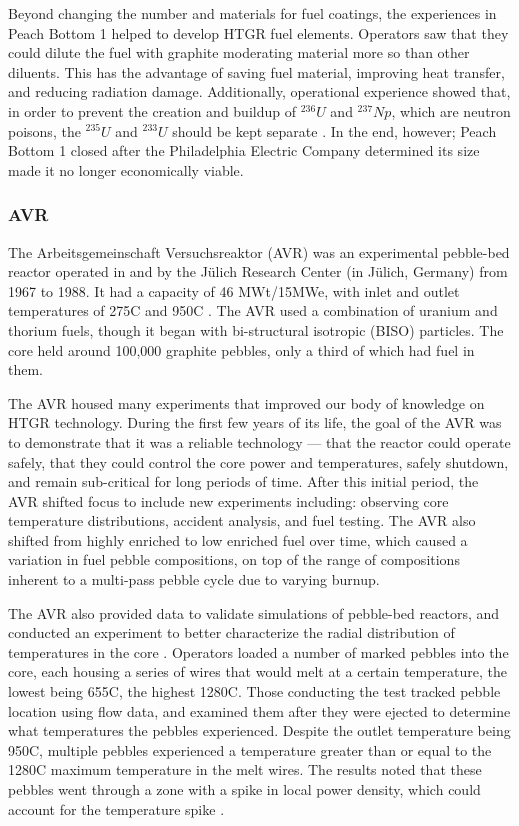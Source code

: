 Beyond changing the number and materials for fuel coatings, the experiences in Peach Bottom 1 helped to develop HTGR fuel elements.  Operators saw that they could dilute the fuel with graphite moderating material more so than other diluents.  This has the advantage of saving fuel material, improving heat transfer, and reducing radiation damage.  Additionally, operational experience showed that, in order to prevent the creation and buildup of $^{236}U$ and $^{237}Np$, which are neutron poisons, the $^{235}U$ and $^{233}U$ should be kept separate \cite{simnad_early_1991}.  In the end, however; Peach Bottom 1 closed after the Philadelphia Electric Company determined its size made it no longer economically viable.

\subsubsection{AVR}
\label{avr}

The Arbeitsgemeinschaft Versuchsreaktor (AVR) was an experimental pebble-bed reactor operated in and by the Jülich Research Center (in Jülich, Germany) from 1967 to 1988.  It had a capacity of 46 MWt/15MWe, with inlet and outlet temperatures of 275\textdegree  C and 950\textdegree  C \cite{beck_high_nodate}.  The AVR used a combination of uranium and thorium fuels, though it began with bi-structural isotropic (BISO) particles.  The core held around 100,000 graphite pebbles, only a third of which had fuel in them.

The AVR housed many experiments that improved our body of knowledge on HTGR technology.  During the first few years of its life, the goal of the AVR was to demonstrate that it was a reliable technology --- that the reactor could operate safely, that they could control the core power and temperatures, safely shutdown, and remain sub-critical for long periods of time.  After this initial period, the AVR shifted focus to include new experiments including: observing core temperature distributions, accident analysis, and fuel testing.  The AVR also shifted from highly enriched to low enriched fuel over time, which caused a variation in fuel pebble compositions, on top of the range of compositions inherent to a multi-pass pebble cycle due to varying burnup.

The AVR also provided data to validate simulations of pebble-bed reactors, and conducted an experiment to better characterize the radial distribution of temperatures in the core \cite{noauthor_results_1990}.  Operators loaded a number of marked pebbles into the core, each housing a series of wires that would melt at a certain temperature, the lowest being 655\textdegree  C, the highest 1280\textdegree  C.  Those conducting the test tracked pebble location using flow data, and examined them after they were ejected to determine what temperatures the pebbles experienced.  Despite the outlet temperature being 950\textdegree  C, multiple pebbles experienced a temperature greater than or equal to the 1280\textdegree C maximum temperature in the melt wires.  The results noted that these pebbles went through a zone with a spike in local power density, which could account for the temperature spike \cite{noauthor_results_1990}.

